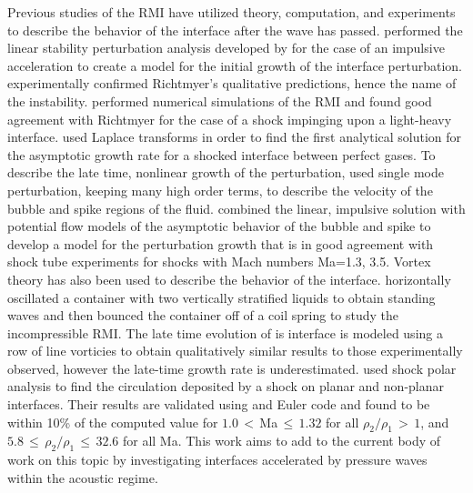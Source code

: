 Previous studies of the \ac{RMI} have utilized theory, computation, and
experiments to describe the behavior of the interface after the wave
has passed. \cite{Richtmyer1960} performed the linear stability
perturbation analysis developed by \cite{Taylor1950} for the case of
an impulsive acceleration to create a model for the initial growth of
the interface perturbation. \cite{Meshkov1969} experimentally
confirmed Richtmyer's qualitative predictions, hence the name of the
instability. \cite{Meyer1972} performed numerical simulations of the
\ac{RMI} and found good agreement with Richtmyer for the case of a
shock impinging upon a light-heavy interface. \cite{Fraley1986} used
Laplace transforms in order to find the first analytical solution for
the asymptotic growth rate for a shocked interface between perfect
gases. To describe the late time, nonlinear growth of the
perturbation, \cite{Zhang1997} used single mode perturbation, keeping
many high order terms, to describe the velocity of the bubble and
spike regions of the fluid. \cite{Sadot1998} combined the linear,
impulsive solution with potential flow models of the asymptotic
behavior of the bubble and spike to develop a model for the
perturbation growth that is in good agreement with shock tube
experiments for shocks with Mach numbers Ma=1.3, 3.5. Vortex theory
has also been used to describe the behavior of the
interface. \cite{Jacobs1996} horizontally oscillated a container with
two vertically stratified liquids to obtain standing waves and then
bounced the container off of a coil spring to study the incompressible
\ac{RMI}. The late time evolution of is interface is modeled using a
row of line vorticies to obtain qualitatively similar results to those
experimentally observed, however the late-time growth rate is
underestimated. \cite{Samtaney1994} used shock polar analysis to find
the circulation deposited by a shock on planar and non-planar
interfaces. Their results are validated using and Euler code and found
to be within 10\% of the computed value for $1.0\,<\,$Ma$\,\leq\,1.32$
for all $\rho_2/\rho_1\,>\,1$, and
$5.8\,\leq\,\rho_2/\rho_1\,\leq\,32.6$ for all Ma. This work aims to
add to the current body of work on this topic by investigating
interfaces accelerated by pressure waves within the acoustic regime.


